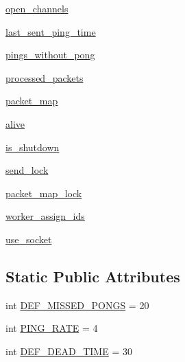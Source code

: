 \begin{DoxyCompactItemize}
\item 
\hyperlink{classparlai_1_1mturk_1_1core_1_1dev_1_1socket__manager_1_1SocketManager_a2f80642e3ea590f4f9428fc2b29d6795}{open\+\_\+channels}
\item 
\hyperlink{classparlai_1_1mturk_1_1core_1_1dev_1_1socket__manager_1_1SocketManager_ac5196ddaac240e82a7b4bdba7afdf59b}{last\+\_\+sent\+\_\+ping\+\_\+time}
\item 
\hyperlink{classparlai_1_1mturk_1_1core_1_1dev_1_1socket__manager_1_1SocketManager_acc4733807d5b940c2938e5088eb452e5}{pings\+\_\+without\+\_\+pong}
\item 
\hyperlink{classparlai_1_1mturk_1_1core_1_1dev_1_1socket__manager_1_1SocketManager_a2733b963a320d8925277bd8078308d9a}{processed\+\_\+packets}
\item 
\hyperlink{classparlai_1_1mturk_1_1core_1_1dev_1_1socket__manager_1_1SocketManager_ade1c4af9d5ec8dc60997553db37b236c}{packet\+\_\+map}
\item 
\hyperlink{classparlai_1_1mturk_1_1core_1_1dev_1_1socket__manager_1_1SocketManager_a853eb0d94f86024bb140644e0a003946}{alive}
\item 
\hyperlink{classparlai_1_1mturk_1_1core_1_1dev_1_1socket__manager_1_1SocketManager_af6ccd7262adc876b6e752257a7feeb31}{is\+\_\+shutdown}
\item 
\hyperlink{classparlai_1_1mturk_1_1core_1_1dev_1_1socket__manager_1_1SocketManager_acc0a0907e66f6bf9b510b493399aaf45}{send\+\_\+lock}
\item 
\hyperlink{classparlai_1_1mturk_1_1core_1_1dev_1_1socket__manager_1_1SocketManager_a2ac5139867a0a05050ff3b388cc0e8fa}{packet\+\_\+map\+\_\+lock}
\item 
\hyperlink{classparlai_1_1mturk_1_1core_1_1dev_1_1socket__manager_1_1SocketManager_ab385890b2361f4eacf67d60584ce99fa}{worker\+\_\+assign\+\_\+ids}
\item 
\hyperlink{classparlai_1_1mturk_1_1core_1_1dev_1_1socket__manager_1_1SocketManager_a8be72239621a74314dad4e859291ae89}{use\+\_\+socket}
\end{DoxyCompactItemize}
\subsection*{Static Public Attributes}
\begin{DoxyCompactItemize}
\item 
int \hyperlink{classparlai_1_1mturk_1_1core_1_1dev_1_1socket__manager_1_1SocketManager_a4120d8dee5c5a0b85a1f9d300566af6a}{D\+E\+F\+\_\+\+M\+I\+S\+S\+E\+D\+\_\+\+P\+O\+N\+GS} = 20
\item 
int \hyperlink{classparlai_1_1mturk_1_1core_1_1dev_1_1socket__manager_1_1SocketManager_aeec66679092aa9c6f4f68efc149438b0}{P\+I\+N\+G\+\_\+\+R\+A\+TE} = 4
\item 
int \hyperlink{classparlai_1_1mturk_1_1core_1_1dev_1_1socket__manager_1_1SocketManager_a395bdf1c09f2f6c8e0dea398333d6e55}{D\+E\+F\+\_\+\+D\+E\+A\+D\+\_\+\+T\+I\+ME} = 30
\end{DoxyCompactItemize}


